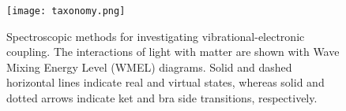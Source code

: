 \documentclass[aip, jcp, reprint, onecolumn]{revtex4-2}
\begin{document}



\begin{figure}[!htbp]
	\centering
	\texttt{[image: taxonomy.png]}
	\caption{
		Spectroscopic methods for investigating vibrational-electronic coupling.
		The interactions of light with matter are shown with Wave Mixing Energy Level (WMEL) diagrams.\cite{RN286}
		Solid and dashed horizontal lines indicate real and virtual states, whereas solid and dotted arrows indicate ket and bra side transitions, respectively. 
	}
	\label{fig:comparisonwmel}
\end{figure}

\end{document}
